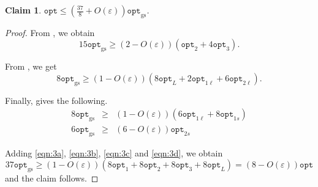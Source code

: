 \documentclass[10pt,a4paper]{amsart}
\renewcommand{\epsilon}{\varepsilon} %
\newtheorem{claim}[theorem]{Claim}
\theoremstyle{definition}
\newcommand{\alg}{\mathtt{opt}_{\mathrm{gs}}}
\newcommand{\opt}{\mathtt{opt}}
\newcommand{\optonel}{\mathtt{opt}_{1\ell}}
\newcommand{\optones}{\mathtt{opt}_{1s}}
\newcommand{\opttwol}{\mathtt{opt}_{2\ell}}
\newcommand{\opttwos}{\mathtt{opt}_{2s}}
\begin{document}
\begin{claim}
\label{cla:37by8}
    $\displaystyle\opt \le \left(\frac{37}{8}+O(\epsilon)\right)\alg$.
\end{claim}
\begin{proof}
    From , we obtain
    \begin{equation}
    \label{eqn:3a}
        15\alg \ge (2-O(\epsilon))(\opt_2+4\opt_3).
    \end{equation}

    From , we get
    \begin{equation}
    \label{eqn:3b}
        8\alg \ge (1-O(\epsilon))(8\opt_L + 2\optonel + 6\opttwol).
    \end{equation}

    Finally,  gives the following.
    \begin{eqnarray}
        8\alg &\ge& (1-O(\epsilon))(6\optonel + 8\optones)  \label{eqn:3c}\\
        6\alg &\ge& (6-O(\epsilon))\opttwos  \label{eqn:3d}
    \end{eqnarray}

    Adding \eqref{eqn:3a}, \eqref{eqn:3b}, \eqref{eqn:3c} and \eqref{eqn:3d}, we obtain
    \[ 37\alg \ge (1-O(\epsilon))(8\opt_1 + 8\opt_2 + 8\opt_3 + 8\opt_L) = (8-O(\epsilon))\opt\]
    and the claim follows.
\end{proof}










\end{document}
